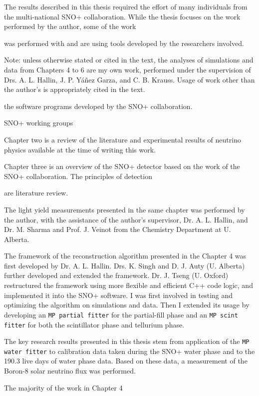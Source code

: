The results described in this thesis required the effort of many individuals from the multi-national SNO+ collaboration. While the thesis focuses on the work performed by the author, some of the work 

was performed
with and are using tools developed by the researchers involved.


Note: unless otherwise stated or cited in the text, the analyses of simulations and data from Chapters 4 to 6 are my own work, performed under the supervision of Drs. A. L. Hallin, J. P. Y\'{a}\~{n}ez Garza, and C. B. Krauss. Usage of work other than the author's is appropriately cited in
the text. 

the software programs developed by the SNO+ collaboration.

SNO+ working groups

Chapter two is a review of the literature
and experimental results of neutrino physics available at the time of writing this work. 

Chapter three is an overview of the SNO+ detector based on the work of the SNO+ collaboration. The principles of detection 

are literature review. 


The light yield measurements presented in the same chapter was performed by the author, with the assistance of the author's supervisor, Dr. A. L. Hallin, and Dr. M. Sharma and Prof. J. Veinot from the Chemistry Department at U. Alberta.

The framework of the reconstruction algorithm presented in the Chapter 4 was first developed by Dr. A. L. Hallin. Drs. K. Singh and D. J. Auty (U. Alberta) further developed and extended the framework. Dr. J. Tseng (U. Oxford) restructured the framework using more flexible and efficient C++ code logic, and implemented it into the SNO+ software. I was first involved in testing and optimizing the algorithm on simulations and data. Then I extended its usage by developing an \texttt{MP partial fitter} for the partial-fill phase and an \texttt{MP scint fitter} for both the scintillator phase and tellurium phase. 


The key research results presented in this thesis stem from application of the \texttt{MP water fitter} to calibration data taken during the SNO+ water phase and to the 190.3 live days of water phase data. Based on these data, a measurement of the Boron-8 solar neutrino flux was performed.

The majority of the work in Chapter 4

